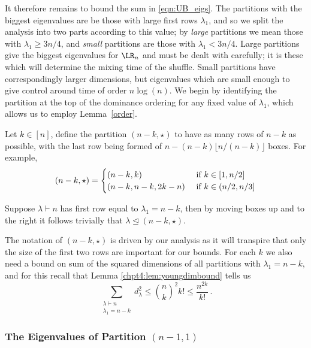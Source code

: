 \documentclass[11pt]{report}
\begin{document}
It therefore remains to bound the sum in \eqref{eqn:UB_eigs}. The partitions with 
the biggest eigenvalues are be those with large first rows $\lambda_{1}$, and so we split the analysis into two parts according to this value; by \emph{large} partitions we mean those with 
$\lambda_{1} \geq 3n/4$, and \emph{small} partitions are those with 
$\lambda_{1} <3n/4$. Large partitions give the biggest eigenvalues for 
$\LR_{n}$ and must be dealt with carefully; it is these which will 
determine the mixing time of the shuffle. Small partitions have 
correspondingly larger dimensions, but eigenvalues which are small enough 
to give control around time of order $n\log(n)$. 
We begin by identifying the partition at the top of the dominance ordering 
for any fixed value of $\lambda_1$, which allows us to employ 
Lemma~\ref{order}.




\begin{defn}
	Let $k\in[n]$, define the partition $(n-k,\star)$ to have as many rows of $n-k$ as possible, with the last row being formed of  $n - (n-k) \lfloor n/(n-k) \rfloor$ boxes. For example,
	\begin{eqnarray*}
		(n-k,\star) = \begin{cases}
			(n-k,k) & \textnormal{ if }k \in[1,n/2] \\
			(n-k,n-k,2k-n) & \textnormal{ if } k \in(n/2,n/3]
		\end{cases}
	\end{eqnarray*}
\end{defn}
\begin{lemma}
	Suppose $\lambda\vdash n$ has first row equal to 
	$\lambda_{1}=n-k$, then by moving boxes up and to the right it follows 
	trivially that  $\lambda \trianglelefteq (n-k,\star)$.
\end{lemma}



The notation of $(n-k,\star)$ is driven by our analysis as it will transpire that only the size of the first two 
rows are important for our bounds. 	For each $k$ we also need a bound 
on sum of the squared dimensions of all partitions with 
$\lambda_{1}=n-k$, and for this recall that Lemma \ref{chpt4:lem:youngdimbound} tells us
\[\sum_{\substack{\lambda \vdash n \\ \lambda_{1} =n-k} }
d_{\lambda}^{2} \leq {n \choose k}^{2} k!\leq   \frac{n^{2k}}{k!} \,.\]






\subsubsection{The Eigenvalues of Partition $(n-1,1)$}
\end{document}
